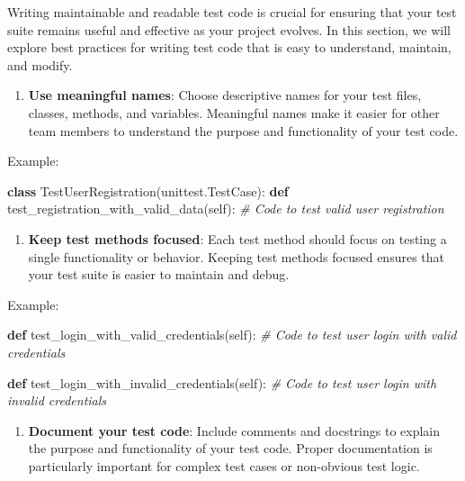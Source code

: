 \documentclass[
  paper=a4,
  ,captions=tableheading
]{scrartcl}
\newenvironment{Shaded}{}{}
\newcommand{\CommentTok}[1]{\textcolor[rgb]{0.38,0.63,0.69}{\textit{#1}}}
\newcommand{\KeywordTok}[1]{\textcolor[rgb]{0.00,0.44,0.13}{\textbf{#1}}}
\newcommand{\NormalTok}[1]{#1}
\newcommand{\VariableTok}[1]{\textcolor[rgb]{0.10,0.09,0.49}{#1}}
\providecommand{\tightlist}{%
  \setlength{\itemsep}{0pt}\setlength{\parskip}{0pt}}
\begin{document}
Writing maintainable and readable test code is crucial for ensuring that
your test suite remains useful and effective as your project evolves. In
this section, we will explore best practices for writing test code that
is easy to understand, maintain, and modify.

\begin{enumerate}
\def\labelenumi{\arabic{enumi}.}
\tightlist
\item
  \textbf{Use meaningful names}: Choose descriptive names for your test
  files, classes, methods, and variables. Meaningful names make it
  easier for other team members to understand the purpose and
  functionality of your test code.
\end{enumerate}

Example:

\begin{Shaded}
\begin{Highlighting}[]
\KeywordTok{class}\NormalTok{ TestUserRegistration(unittest.TestCase):}
    \KeywordTok{def}\NormalTok{ test\_registration\_with\_valid\_data(}\VariableTok{self}\NormalTok{):}
        \CommentTok{\# Code to test valid user registration}
\end{Highlighting}
\end{Shaded}

\begin{enumerate}
\def\labelenumi{\arabic{enumi}.}
\setcounter{enumi}{1}
\tightlist
\item
  \textbf{Keep test methods focused}: Each test method should focus on
  testing a single functionality or behavior. Keeping test methods
  focused ensures that your test suite is easier to maintain and debug.
\end{enumerate}

Example:

\begin{Shaded}
\begin{Highlighting}[]
\KeywordTok{def}\NormalTok{ test\_login\_with\_valid\_credentials(}\VariableTok{self}\NormalTok{):}
    \CommentTok{\# Code to test user login with valid credentials}

\KeywordTok{def}\NormalTok{ test\_login\_with\_invalid\_credentials(}\VariableTok{self}\NormalTok{):}
    \CommentTok{\# Code to test user login with invalid credentials}
\end{Highlighting}
\end{Shaded}

\begin{enumerate}
\def\labelenumi{\arabic{enumi}.}
\setcounter{enumi}{2}
\tightlist
\item
  \textbf{Document your test code}: Include comments and docstrings to
  explain the purpose and functionality of your test code. Proper
  documentation is particularly important for complex test cases or
  non-obvious test logic.
\end{enumerate}
\end{document}
